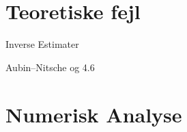 \section{Teoretiske fejl}
\begin{frame}{Inverse Estimater}{}
\end{frame}
\begin{frame}{Aubin–Nitsche og 4.6}{}
\end{frame}

\section{Numerisk Analyse}